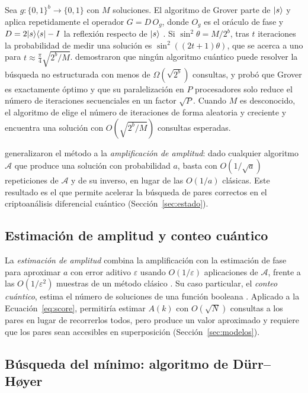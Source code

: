 Sea \(g:\{0,1\}^b\to\{0,1\}\) con \(M\) soluciones. El algoritmo de Grover parte de \(\lvert s\rangle\) y aplica repetidamente el operador \(G=D\,O_g\), donde \(O_g\) es el oráculo de fase y \(D=2\lvert s\rangle\langle s\rvert-I\) la reflexión respecto de \(\lvert s\rangle\) \citep{grover1996}. Si \(\sin^2\theta=M/2^b\), tras \(t\) iteraciones la probabilidad de medir una solución es \(\sin^2((2t+1)\theta)\), que se acerca a uno para \(t\approx\frac{\pi}{4}\sqrt{2^b/M}\). \citet{bbbv1997} demostraron que ningún algoritmo cuántico puede resolver la búsqueda no estructurada con menos de \(\Omega(\sqrt{2^b})\) consultas, y \citet{zalka1999} probó que Grover es exactamente óptimo y que su paralelización en \(P\) procesadores solo reduce el número de iteraciones secuenciales en un factor \(\sqrt{P}\). Cuando \(M\) es desconocido, el algoritmo de \citet{bbht1998} elige el número de iteraciones de forma aleatoria y creciente y encuentra una solución con \(O(\sqrt{2^b/M})\) consultas esperadas.

\citet{bhmt2002} generalizaron el método a la \emph{amplificación de amplitud}: dado cualquier algoritmo \(\mathcal{A}\) que produce una solución con probabilidad \(a\), basta con \(O(1/\sqrt{a})\) repeticiones de \(\mathcal{A}\) y de su inverso, en lugar de las \(O(1/a)\) clásicas. Este resultado es el que permite acelerar la búsqueda de pares correctos en el criptoanálisis diferencial cuántico (Sección~\ref{sec:estado}).

\subsection{Estimación de amplitud y conteo cuántico}

La \emph{estimación de amplitud} combina la amplificación con la estimación de fase para aproximar \(a\) con error aditivo \(\varepsilon\) usando \(O(1/\varepsilon)\) aplicaciones de \(\mathcal{A}\), frente a las \(O(1/\varepsilon^2)\) muestras de un método clásico \citep{bhmt2002}. Su caso particular, el \emph{conteo cuántico}, estima el número de soluciones de una función booleana \citep{bht1998counting}. Aplicado a la Ecuación~\ref{eq:score}, permitiría estimar \(A(k)\) con \(O(\sqrt{N})\) consultas a los pares en lugar de recorrerlos todos, pero produce un valor aproximado y requiere que los pares sean accesibles en superposición (Sección~\ref{sec:modelos}).

\subsection{Búsqueda del mínimo: algoritmo de Dürr--Høyer}

